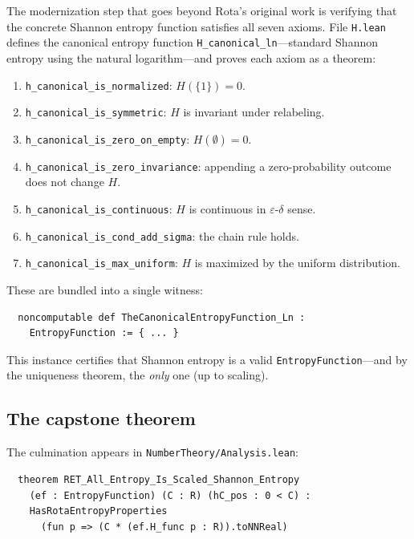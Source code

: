 \documentclass[12pt,a4paper]{article}
\theoremstyle{definition}
\newcommand{\lean}[1]{\texttt{#1}}
\begin{document}
The modernization step that goes beyond Rota's original work is
verifying that the concrete Shannon entropy function satisfies all seven
axioms.  File \lean{H.lean} defines the canonical entropy function
\lean{H\_canonical\_ln}---standard Shannon entropy using the natural
logarithm---and proves each axiom as a theorem:

\begin{enumerate}[nosep]
  \item \lean{h\_canonical\_is\_normalized}: $H(\{1\}) = 0$.
  \item \lean{h\_canonical\_is\_symmetric}: $H$ is invariant under
    relabeling.
  \item \lean{h\_canonical\_is\_zero\_on\_empty}: $H(\emptyset) = 0$.
  \item \lean{h\_canonical\_is\_zero\_invariance}: appending a
    zero-probability outcome does not change $H$.
  \item \lean{h\_canonical\_is\_continuous}: $H$ is continuous in
    $\varepsilon$-$\delta$ sense.
  \item \lean{h\_canonical\_is\_cond\_add\_sigma}: the chain rule
    holds.
  \item \lean{h\_canonical\_is\_max\_uniform}: $H$ is maximized by
    the uniform distribution.
\end{enumerate}

These are bundled into a single witness:

\begin{verbatim}
  noncomputable def TheCanonicalEntropyFunction_Ln :
    EntropyFunction := { ... }
\end{verbatim}

\noindent
This instance certifies that Shannon entropy is a valid
\lean{EntropyFunction}---and by the uniqueness theorem, the
\emph{only} one (up to scaling).

\subsection{The capstone theorem}

The culmination appears in \lean{NumberTheory/Analysis.lean}:

\begin{verbatim}
  theorem RET_All_Entropy_Is_Scaled_Shannon_Entropy
    (ef : EntropyFunction) (C : R) (hC_pos : 0 < C) :
    HasRotaEntropyProperties
      (fun p => (C * (ef.H_func p : R)).toNNReal)
\end{verbatim}
\end{document}
